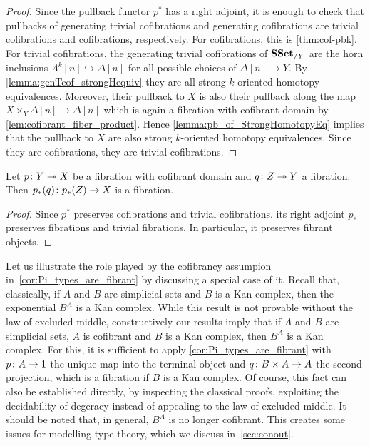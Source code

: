 \documentclass[reqno,10pt,a4paper,oneside,draft]{amsart}
\begin{document}
\begin{proof} Since the pullback functor $p^*$ has a right adjoint,  it is enough to check that pullbacks of generating trivial cofibrations and generating cofibrations are trivial cofibrations and cofibrations, respectively. For cofibrations, this is \cref{thm:cof-pbk}. For trivial cofibrations, the generating trivial cofibrations of $\mathbf{SSet}_{/Y}$ are the horn inclusions $\Lambda^{k}[n] \hookrightarrow \Delta[n]$ for all possible choices of $\Delta[n] \rightarrow Y$. By \cref{lemma:genTcof_strongHequiv} they are all strong $k$-oriented homotopy equivalences. Moreover, their pullback to $X$ is also their pullback along the map $X \times_Y \Delta[n] \rightarrow \Delta[n]$ which is again a fibration with cofibrant domain by \cref{lem:cofibrant_fiber_product}. Hence  \cref{lemma:pb_of_StrongHomotopyEq} implies that the pullback to $X$ are also strong $k$-oriented homotopy equivalences. Since they are cofibrations, they are trivial cofibrations.
\end{proof}

\begin{corollary}\label{cor:Pi_types_are_fibrant}
Let $p \colon Y \twoheadrightarrow X$ be a fibration with cofibrant domain and $q \colon Z \twoheadrightarrow Y$ a fibration. Then $p_*(q) \colon p_*(Z) \rightarrow X$ is a fibration.
\end{corollary}

\begin{proof}
Since $p^*$ preserves cofibrations and trivial cofibrations. its right adjoint $p_*$ preserves fibrations and trivial fibrations. In particular, it preserves fibrant objects.
\end{proof}


Let us illustrate the role played by the cofibrancy assumpion in~\cref{cor:Pi_types_are_fibrant} by discussing
a special case of it. Recall that, classically,  if $A$ and $B$ are simplicial
sets and $B$ is a Kan complex, then the exponential $B^A$ is a Kan complex. While this result is
not provable without the law of excluded middle, constructively our results imply that if $A$ and $B$ are simplicial sets, $A$ is cofibrant and $B$ is a Kan complex, then $B^A$ is a Kan complex. For this, it is sufficient to apply \cref{cor:Pi_types_are_fibrant}
with $p \colon A \to 1$ the unique map into the terminal object and $q \colon B \times A \to A$ the second projection, which is a fibration if $B$ is a Kan complex. Of course, this fact can also be established directly, by inspecting the classical proofs, exploiting the decidability of degeracy instead of appealing to the law of excluded middle.
It should be noted that, in general, $B^A$ is no longer cofibrant. This creates some issues for modelling type
theory, which we discuss in~\cref{sec:conout}.
\end{document}
